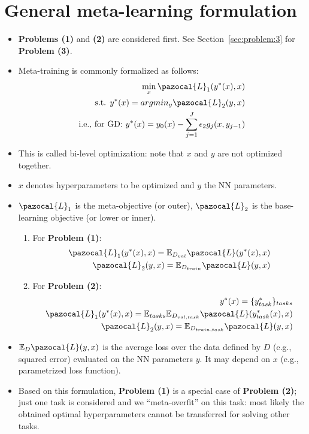 \section{General meta-learning formulation}
\begin{itemize}
	\item \textbf{Problems (1)} and \textbf{(2)} are considered first. 
	See Section~\ref{sec:problem:3} for \textbf{Problem (3)}.
	\item Meta-training is commonly formalized as follows:
	\begin{equation}
		\begin{aligned}
			\min_{x} \pazocal{L}_1(y^*(x), x) \\
			\text{s.t. } y^*(x) = argmin_y \pazocal{L}_2(y, x) \\
			\text{i.e., for GD: } y^*(x) = y_0(x) - \sum_{j=1}^{J}\epsilon_2 g_j(x, y_{j-1})
		\end{aligned}
	\end{equation}
	\item This is called bi-level optimization: note that $x$ and $y$ are not optimized together.
	\item $x$ denotes hyperparameters to be optimized and $y$ the NN parameters.
	\item $\pazocal{L}_1$ is the meta-objective (or outer), $\pazocal{L}_2$ is the base-learning objective (or lower or inner).
	\begin{enumerate}
		\item For \textbf{Problem (1)}:
		\begin{equation}\label{eq:problem:1:losses}
			\begin{aligned}
				\pazocal{L}_1(y^*(x), x) = \mathbb{E}_{D_{val}} \pazocal{L}(y^*(x), x) \\
				\pazocal{L}_2(y, x) = \mathbb{E}_{D_{train}} \pazocal{L}(y, x)
			\end{aligned}
		\end{equation}
		\item For \textbf{Problem (2)}:
		\begin{equation}\label{eq:problem:2:losses}
			\begin{aligned}
				y^*(x) = \{y^*_{task}\}_{tasks}\\
				\pazocal{L}_1(y^*(x), x) = \mathbb{E}_{tasks}\mathbb{E}_{D_{val, task}} \pazocal{L}(y^*_{task}(x), x) \\
				\pazocal{L}_2(y, x) = \mathbb{E}_{D_{train, task}} \pazocal{L}(y, x)
			\end{aligned}
		\end{equation}
	\end{enumerate}
	\item $\mathbb{E}_{D}\pazocal{L}(y, x)$ is the average loss over the data defined by $D$ (e.g., squared error) evaluated on the NN parameters $y$. It may depend on $x$ (e.g., parametrized loss function). 
	\item Based on this formulation, \textbf{Problem (1)} is a special case of \textbf{Problem (2)}; just one task is considered and we ``meta-overfit'' on this task: most likely the obtained optimal hyperparameters cannot be transferred for solving other tasks.
\end{itemize}

